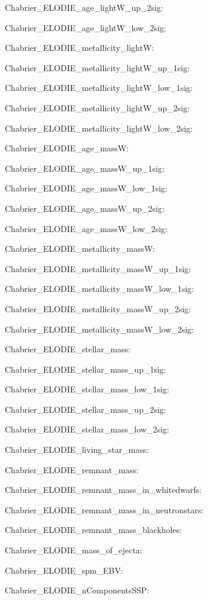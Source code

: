\item Chabrier\_ELODIE\_age\_lightW\_up\_2sig: 
\item Chabrier\_ELODIE\_age\_lightW\_low\_2sig: 
\item Chabrier\_ELODIE\_metallicity\_lightW: 
\item Chabrier\_ELODIE\_metallicity\_lightW\_up\_1sig: 
\item Chabrier\_ELODIE\_metallicity\_lightW\_low\_1sig: 
\item Chabrier\_ELODIE\_metallicity\_lightW\_up\_2sig: 
\item Chabrier\_ELODIE\_metallicity\_lightW\_low\_2sig: 
\item Chabrier\_ELODIE\_age\_massW: 
\item Chabrier\_ELODIE\_age\_massW\_up\_1sig: 
\item Chabrier\_ELODIE\_age\_massW\_low\_1sig: 
\item Chabrier\_ELODIE\_age\_massW\_up\_2sig: 
\item Chabrier\_ELODIE\_age\_massW\_low\_2sig: 
\item Chabrier\_ELODIE\_metallicity\_massW: 
\item Chabrier\_ELODIE\_metallicity\_massW\_up\_1sig: 
\item Chabrier\_ELODIE\_metallicity\_massW\_low\_1sig: 
\item Chabrier\_ELODIE\_metallicity\_massW\_up\_2sig: 
\item Chabrier\_ELODIE\_metallicity\_massW\_low\_2sig: 
\item Chabrier\_ELODIE\_stellar\_mass: 
\item Chabrier\_ELODIE\_stellar\_mass\_up\_1sig: 
\item Chabrier\_ELODIE\_stellar\_mass\_low\_1sig: 
\item Chabrier\_ELODIE\_stellar\_mass\_up\_2sig: 
\item Chabrier\_ELODIE\_stellar\_mass\_low\_2sig: 
\item Chabrier\_ELODIE\_living\_star\_mass: 
\item Chabrier\_ELODIE\_remnant\_mass: 
\item Chabrier\_ELODIE\_remnant\_mass\_in\_whitedwarfs: 
\item Chabrier\_ELODIE\_remnant\_mass\_in\_neutronstars: 
\item Chabrier\_ELODIE\_remnant\_mass\_blackholes: 
\item Chabrier\_ELODIE\_mass\_of\_ejecta: 
\item Chabrier\_ELODIE\_spm\_EBV: 
\item Chabrier\_ELODIE\_nComponentsSSP: 
